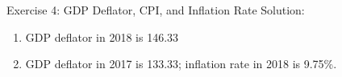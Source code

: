 \documentclass[9pt]{beamer}
\begin{document}
\begin{frame}{Exercise 4: GDP Deflator, CPI, and Inflation Rate}
    Solution:
    \begin{enumerate}
        \item GDP deflator in 2018 is 146.33
        \item GDP deflator in 2017 is 133.33; inflation rate in 2018 is 9.75\%.
    \end{enumerate}
\end{frame}

\end{document}
